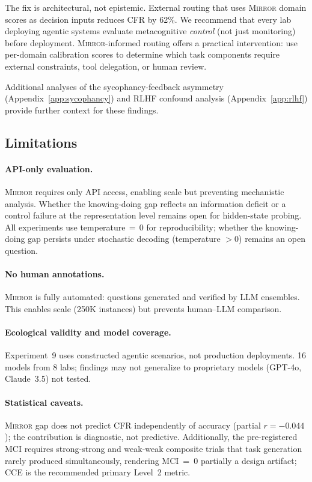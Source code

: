 \documentclass[10pt]{article}
\newcommand{\mirror}{\textsc{Mirror}}
\newcommand{\MCI}{MCI}
\newcommand{\CCE}{CCE}
\newcommand{\CFR}{CFR}
\begin{document}
The fix is architectural, not epistemic. External routing that uses \mirror{}
domain scores as decision inputs reduces \CFR{} by 62\%. We recommend that every
lab deploying agentic systems evaluate metacognitive \textit{control} (not just
monitoring) before deployment. \mirror{}-informed routing offers a practical
intervention: use per-domain calibration scores to determine which task components
require external constraints, tool delegation, or human review.

Additional analyses of the sycophancy-feedback asymmetry (Appendix~\ref{app:sycophancy}) and RLHF confound analysis (Appendix~\ref{app:rlhf}) provide further context for these findings.

\subsection{Limitations}

\paragraph{API-only evaluation.}
\mirror{} requires only API access, enabling scale but preventing mechanistic
analysis. Whether the knowing-doing gap reflects an information deficit or a
control failure at the representation level remains open for hidden-state probing.
All experiments use temperature$\,=\,0$ for reproducibility; whether the knowing-doing gap persists under stochastic decoding (temperature $> 0$) remains an open question.

\paragraph{No human annotations.}
\mirror{} is fully automated: questions generated and verified by LLM ensembles.
This enables scale (250K instances) but prevents human--LLM comparison.

\paragraph{Ecological validity and model coverage.}
Experiment~9 uses constructed agentic scenarios, not production deployments. 16 models from 8 labs; findings may not generalize to proprietary models (GPT-4o, Claude~3.5) not tested.

\paragraph{Statistical caveats.}
\mirror{} gap does not predict \CFR{} independently of accuracy (partial $r = -0.044$); the contribution is diagnostic, not predictive. Additionally, the pre-registered \MCI{} requires strong-strong and weak-weak composite trials that task generation rarely produced simultaneously, rendering \MCI{}~=~0 partially a design artifact; \CCE{} is the recommended primary Level~2 metric.
\end{document}

